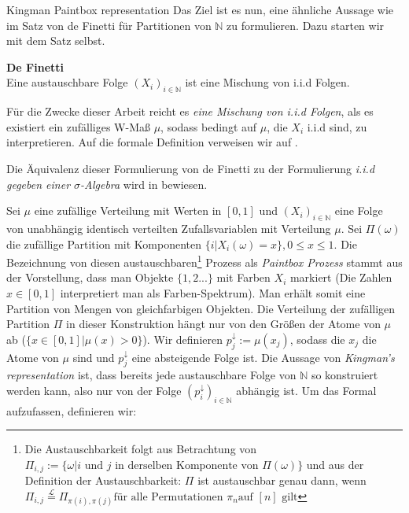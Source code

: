 \begin{section}{Kingman Paintbox representation}
Das Ziel ist es nun, eine ähnliche Aussage wie im Satz von de Finetti für Partitionen von $\mathbb{N}$ zu formulieren. Dazu starten wir mit dem Satz selbst.
\begin{theorem}\cite[Theorem 3.1]{aldous2006ecole}{\textbf{De Finetti}}\\
    Eine austauschbare Folge $(X_i)_{i \in \mathbb{N}}$ ist eine Mischung von i.i.d Folgen.
\end{theorem}
\begin{Bemerkung}
    Für die Zwecke dieser Arbeit reicht es \textit{eine Mischung von i.i.d Folgen}, als \glqq es existiert ein zufälliges W-Maß $\mu$, sodass bedingt auf $\mu$, die $X_i$ i.i.d sind\grqq, zu interpretieren. Auf die formale Definition verweisen wir auf \cite[Abschnitt 1.2]{aldous2006ecole}.
\end{Bemerkung}
\begin{Bemerkung}
    Die Äquivalenz dieser Formulierung von de Finetti zu der Formulierung \textit{i.i.d gegeben einer $\sigma$-Algebra} wird in \cite[Lemma 2.18]{aldous2006ecole} bewiesen.  
\end{Bemerkung}
Sei $\mu$ eine zufällige Verteilung mit Werten in $[0,1]$ und $(X_i)_{i \in \mathbb{N}}$ eine Folge von unabhängig identisch verteilten Zufallsvariablen mit Verteilung $\mu$. Sei $\Pi(\omega)$ die zufällige Partition mit Komponenten $\{i| X_i(\omega) = x\},  0 \leq x \leq 1$. Die Bezeichnung von diesen austauschbaren\footnote{Die Austauschbarkeit folgt aus Betrachtung von $\Pi_{i,j} := \{\omega | i \text{ und } j \text{ in derselben Komponente von } \Pi(\omega)\}$ und aus der Definition der Austauschbarkeit: $\Pi$ ist austauschbar genau dann, wenn $\Pi_{i,j} \stackrel{\mathcal{L}}{=} \Pi_{\pi(i),\pi(j)} \text{für alle Permutationen }\pi_n \text{auf }[n] \text{ gilt}$} Prozess als \textit{Paintbox Prozess} stammt aus der Vorstellung, dass man Objekte $\{1,2 ...\}$ mit Farben $X_i$ markiert (Die Zahlen $x \in [0,1]$ interpretiert man als Farben-Spektrum). 
Man erhält somit eine Partition von Mengen von gleichfarbigen Objekten. Die Verteilung der zufälligen Partition $\Pi$ in dieser Konstruktion hängt nur von den Größen der Atome von $\mu$ ab ($\{x \in [0,1] | \mu(x) > 0 \}$). Wir definieren $p^\downarrow_j := \mu(x_j)$, sodass die $x_j$ die Atome von $\mu$ sind und $p_j^\downarrow$ eine absteigende Folge ist. Die Aussage von \textit{Kingman's representation} ist, dass bereits jede austauschbare Folge von $\mathbb{N}$ so konstruiert werden kann, also nur von der Folge $(p^\downarrow_i)_{i \in \mathbb{N}}$ abhängig ist. Um das Formal aufzufassen, definieren wir:

\end{section}
